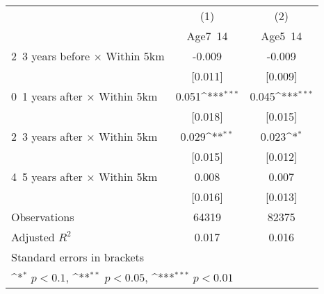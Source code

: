 {
\def\sym#1{\ifmmode^{#1}\else\(^{#1}\)\fi}
\begin{tabular}{l*{2}{c}}
\hline\hline
                    &\multicolumn{1}{c}{(1)}&\multicolumn{1}{c}{(2)}\\
                    &\multicolumn{1}{c}{Age7~14}&\multicolumn{1}{c}{Age5~14}\\
\hline
2~3 years before × Within 5km&      -0.009         &      -0.009         \\
                    &     [0.011]         &     [0.009]         \\
0~1 years after × Within 5km&       0.051\sym{***}&       0.045\sym{***}\\
                    &     [0.018]         &     [0.015]         \\
2~3 years after × Within 5km&       0.029\sym{**} &       0.023\sym{*}  \\
                    &     [0.015]         &     [0.012]         \\
4~5 years after × Within 5km&       0.008         &       0.007         \\
                    &     [0.016]         &     [0.013]         \\
\hline
Observations        &       64319         &       82375         \\
Adjusted \(R^{2}\)  &       0.017         &       0.016         \\
\hline\hline
\multicolumn{3}{l}{\footnotesize Standard errors in brackets}\\
\multicolumn{3}{l}{\footnotesize \sym{*} \(p<0.1\), \sym{**} \(p<0.05\), \sym{***} \(p<0.01\)}\\
\end{tabular}
}
